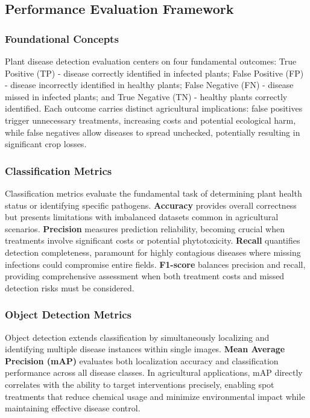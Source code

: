 \documentclass[sn-mathphys]{sn-jnl}
\theoremstyle{thmstyleone}%
\theoremstyle{thmstyletwo}%
\theoremstyle{thmstylethree}%
\begin{document}
\subsection{Performance Evaluation Framework}

\subsubsection{Foundational Concepts}
Plant disease detection evaluation centers on four fundamental outcomes: True Positive (TP) - disease correctly identified in infected plants; False Positive (FP) - disease incorrectly identified in healthy plants; False Negative (FN) - disease missed in infected plants; and True Negative (TN) - healthy plants correctly identified. Each outcome carries distinct agricultural implications: false positives trigger unnecessary treatments, increasing costs and potential ecological harm, while false negatives allow diseases to spread unchecked, potentially resulting in significant crop losses.

\subsubsection{Classification Metrics}
Classification metrics evaluate the fundamental task of determining plant health status or identifying specific pathogens. \textbf{Accuracy} provides overall correctness but presents limitations with imbalanced datasets common in agricultural scenarios. \textbf{Precision} measures prediction reliability, becoming crucial when treatments involve significant costs or potential phytotoxicity. \textbf{Recall} quantifies detection completeness, paramount for highly contagious diseases where missing infections could compromise entire fields. \textbf{F1-score} balances precision and recall, providing comprehensive assessment when both treatment costs and missed detection risks must be considered.

\subsubsection{Object Detection Metrics}
Object detection extends classification by simultaneously localizing and identifying multiple disease instances within single images. \textbf{Mean Average Precision (mAP)} evaluates both localization accuracy and classification performance across all disease classes. In agricultural applications, mAP directly correlates with the ability to target interventions precisely, enabling spot treatments that reduce chemical usage and minimize environmental impact while maintaining effective disease control.
\end{document}
